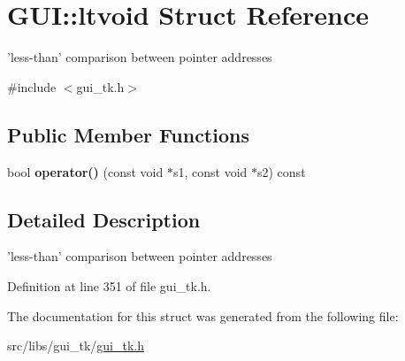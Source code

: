 \hypertarget{structGUI_1_1ltvoid}{\section{G\-U\-I\-:\-:ltvoid Struct Reference}
\label{structGUI_1_1ltvoid}
}


'less-\/than' comparison between pointer addresses  




{\ttfamily \#include $<$gui\-\_\-tk.\-h$>$}

\subsection*{Public Member Functions}
\begin{DoxyCompactItemize}
\item 
\hypertarget{structGUI_1_1ltvoid_a706be252c47c846981c7f1c47f2ea186}{bool {\bfseries operator()} (const void $\ast$s1, const void $\ast$s2) const }\label{structGUI_1_1ltvoid_a706be252c47c846981c7f1c47f2ea186}

\end{DoxyCompactItemize}


\subsection{Detailed Description}
'less-\/than' comparison between pointer addresses 

Definition at line 351 of file gui\-\_\-tk.\-h.



The documentation for this struct was generated from the following file\-:\begin{DoxyCompactItemize}
\item 
src/libs/gui\-\_\-tk/\hyperlink{gui__tk_8h}{gui\-\_\-tk.\-h}\end{DoxyCompactItemize}
